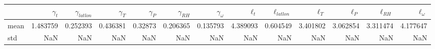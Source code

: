 \begin{tabular}{lrrrrrrrrrrrr}
\toprule
{} &  $\gamma_t$ &  $\gamma_{latlon}$ &  $\gamma_T$ &  $\gamma_P$ &  $\gamma_{RH}$ &  $\gamma_\omega$ &  $\ell_t$ &  $\ell_{latlon}$ &  $\ell_T$ &  $\ell_P$ &  $\ell_{RH}$ &  $\ell_\omega$ \\
\midrule
mean &    1.483759 &           0.252393 &    0.436381 &     0.32873 &       0.206365 &         0.135793 &  4.389093 &         0.604549 &  3.401802 &  3.062854 &     3.311474 &       4.177647 \\
std  &         NaN &                NaN &         NaN &         NaN &            NaN &              NaN &       NaN &              NaN &       NaN &       NaN &          NaN &            NaN \\
\bottomrule
\end{tabular}
